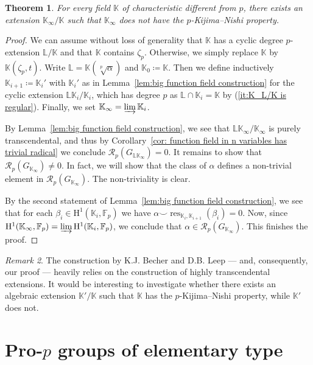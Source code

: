 \documentclass{amsart}
\newtheorem{thm}{Theorem}[section]
\theoremstyle{definition}
\theoremstyle{remark}
\newtheorem{rem}[thm]{Remark}
\DeclareMathOperator{\res}{res}
\newcommand{\KK}{\mathbb{K}}
\newcommand{\LL}{\mathbb{L}}
\newcommand{\FF}{\mathbb{F}}
\newcommand{\calR}{\mathcal{R}}
\newcommand{\rmH}{\mathrm H}%
\begin{document}
\begin{thm}
\label{thm:Fields without p-Kijima}
    For every field $\KK$ of characteristic different from $p$, there exists an extension $\KK_\infty/\KK$ such that $\KK_\infty$ does not have the $p$-Kijima--Nishi property. 
\end{thm}
\begin{proof}
    We can assume without loss of generality that $\KK$ has a cyclic degree $p$-extension $\LL/\KK$ and that $\KK$ contains $\zeta_p$. Otherwise, we simply replace $\KK$ by $\KK(\zeta_p,t)$. Write $\LL=\KK(\sqrt[p]{\alpha})$  and $\KK_0\coloneq  \KK$. Then we define inductively $\KK_{i+1}\coloneq  \KK_i'$ with $\KK_i'$ as in Lemma~\ref{lem:big function field construction} for the cyclic extension $\LL\KK_i/\KK_i$, which has degree $p$ as $\LL\cap \KK_i=\KK$ by (\ref{it:K_L/K is regular}). Finally, we set $\KK_\infty=\varinjlim \KK_i$.

    By Lemma~\ref{lem:big function field construction}, we see that $\LL\KK_\infty/\KK_\infty$ is purely transcendental, and thus by Corollary~\ref{cor: function field in n variables has trivial radical} we conclude $\calR_p(G_{\LL\KK_\infty})=0$. It remains to show that $\calR_p(G_{{\KK}_\infty})\neq 0$. In fact, we will show that the class of $\alpha$ defines a non-trivial element in $\calR_p(G_{\KK_\infty})$. The non-triviality is clear. 

    By the second statement of Lemma~\ref{lem:big function field construction}, we see that for each $\beta_i\in \rmH^1(\KK_i,\FF_p)$ we have $\alpha\smallsmile\res_{\KK_i,\KK_{i+1}}(\beta_i)=0$. Now, since $\rmH^1(\KK_\infty,\FF_p)=\varinjlim \rmH^1(\KK_i,\FF_p)$, we conclude that $\alpha\in \calR_p(G_{{\KK}_\infty})$. This finishes the proof.
\end{proof}
\begin{rem}
    The construction by K.J. Becher and D.B. Leep --- and, consequently, our proof --- heavily relies on the construction of highly transcendental extensions. 
    It would be interesting to investigate whether there exists an algebraic extension $\KK'/\KK$ such that $\KK$ has the $p$-Kijima--Nishi property, while $\KK'$ does not.  
\end{rem}


\section{Pro-\texorpdfstring{$p$}{} groups of elementary type}
\label{sec:Elementary Type groups have KN}
\end{document}

